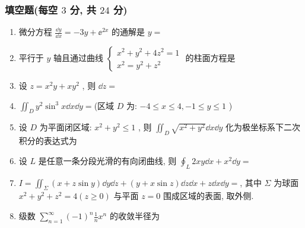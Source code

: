 \subsubsection{填空题(每空 $3$ 分, 共 $24$ 分)}
\begin{enumerate}
	\item 微分方程 $\frac{\dd y}{\dd x}=-3 y+\ee^{2 x}$ 的通解是 $y=$\underline{\hspace{8pc}}
	
	\item 平行于 $y$ 轴且通过曲线 $\begin{cases}
	x^{2}+y^{2}+4 z^{2}=1\\
	x^{2}=y^{2}+z^{2}
	\end{cases}$ 的柱面方程是\underline{\hspace{8pc}}
	
	\item 设 $z=x^{2} y+x y^{2}$ , 则 $\dd z=$\underline{\hspace{8pc}}
	
	\item $\iint_{D} y^{2} \sin ^{3} x \dd x \dd y=$\underline{\hspace{8pc}}(区域 $D$ 为: $-4 \leq x \leq 4,-1 \leq y \leq 1$ )
	
	\item 设 $D$ 为平面闭区域: $x^{2}+y^{2} \leq 1$ , 则 $\iint_{D} \sqrt{x^{2}+y^{2}} \dd x \dd y$ 化为极坐标系下二次积分的表达式为\underline{\hspace{8pc}}
	
	\item 设 $L$ 是任意一条分段光滑的有向闭曲线, 则 $\oint_{L} 2 x y \dd x+x^{2} \dd y=$\underline{\hspace{8pc}}
	
	\item $I=\iint_{\Sigma}(x+z \sin y) \dd y \dd z+(y+x \sin z) \dd z \dd x+z \dd x \dd y=$\underline{\hspace{8pc}}, 其中 $\Sigma$ 为球面 $x^{2}+y^{2}+z^{2}=4(z \geq 0)$ 与平面 $z=0$ 围成区域的表面, 取外侧.
	
	\item 级数 $\sum_{n=1}^{\infty}(-1)^{n} \frac{1}{n} x^{n}$ 的收敛半径为\underline{\hspace{8pc}}
\end{enumerate}

